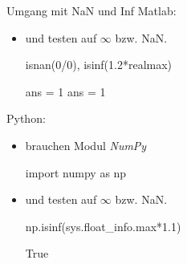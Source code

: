 \documentclass[hyperref={xetex}]{beamer}
\begin{document}
\begin{frame}[fragile]{Umgang mit NaN und       Inf  }
  Matlab:
\begin{itemize}
\item \alert{ } und \alert{ } testen auf
$\infty$ bzw. NaN.
 \begin{matlabin}
isnan(0/0), isinf(1.2*realmax)
\end{matlabin}
\begin{matlab}
ans =   1  ans =   1
\end{matlab}
\end{itemize}
Python:
\begin{itemize}
  \item brauchen Modul \textsl{NumPy}\\
    \begin{pyin}
import numpy as np
    \end{pyin}
  \item {} und   testen auf
    $\infty$ bzw. NaN.
    \begin{pyin}
np.isinf(sys.float_info.max*1.1)      
    \end{pyin}
    \begin{pyout}
True      
    \end{pyout}
\end{itemize}

\end{frame}
%
%
%
%
\end{document}
